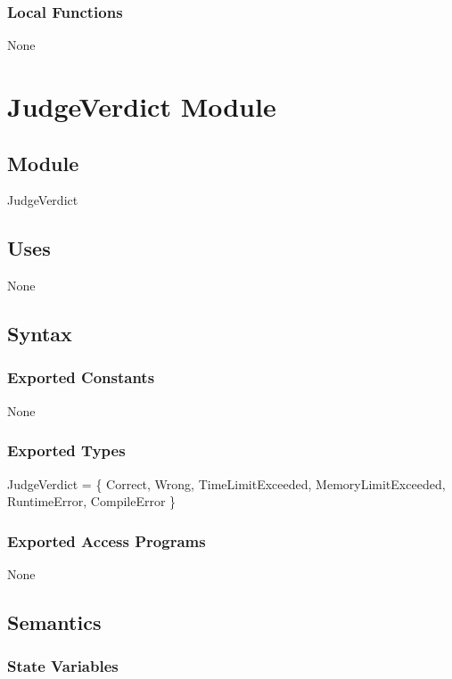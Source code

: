 \documentclass[12pt, titlepage]{article}
\begin{document}
\subsubsection{Local Functions}

None

\newpage

\section{JudgeVerdict Module} \label{JudgeVerdict} 

\subsection{Module}

JudgeVerdict

\subsection{Uses}

None

\subsection{Syntax}

\subsubsection{Exported Constants}

None

\subsubsection{Exported Types}

JudgeVerdict = \{ Correct, Wrong, TimeLimitExceeded, MemoryLimitExceeded, \\RuntimeError, CompileError \} 

\subsubsection{Exported Access Programs}

None

\subsection{Semantics}

\subsubsection{State Variables}
\end{document}
